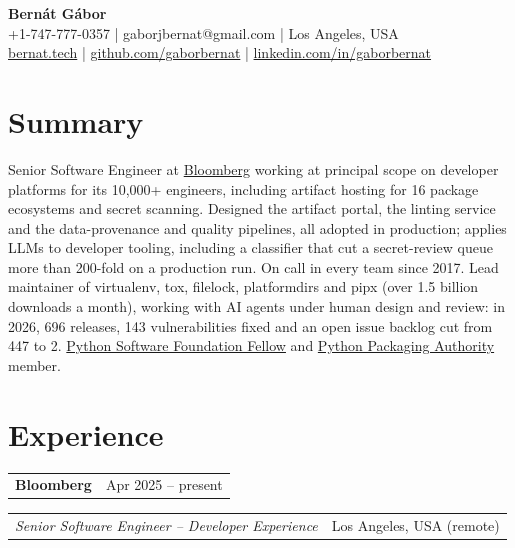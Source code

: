 \documentclass[10pt]{article}
\makeatletter
\newcommand{\entry}{\needspace{6\baselineskip}}
\newcommand{\twoColumns}[2]{%
  \noindent
  \begin{tabularx}{\textwidth}{@{}X r@{}}#2 & {\color{muted}#1}\\
  \end{tabularx}\par
}
\newcommand{\cvrule}{}
\makeatother
\begin{document}
\begin{center}
  {\Huge\bfseries\color{accent}Bernát Gábor}\\[6pt]
  +1-747-777-0357 \enspace|\enspace{} gaborjbernat@gmail.com \enspace|\enspace{} Los Angeles, USA\\ %
  \href{https://bernat.tech}{bernat.tech} \enspace|\enspace{}
  \href{https://github.com/gaborbernat}{github.com/gaborbernat} \enspace|\enspace{}
  \href{https://www.linkedin.com/in/gaborbernat}{linkedin.com/in/gaborbernat}
\end{center}

\section*{Summary}
\cvrule%
Senior Software Engineer at \href{https://www.bloomberg.com/company/}{Bloomberg} working at principal scope on
developer platforms for its 10{,}000+ engineers, including artifact hosting for 16 package ecosystems and secret
scanning. Designed the artifact portal, the linting service and the data-provenance and quality pipelines, all adopted
in production; applies LLMs to developer
tooling, including a classifier that cut a secret-review queue more than 200-fold on a production run. On call in every
team since 2017. Lead maintainer of virtualenv, tox, filelock, platformdirs and pipx (over 1.5 billion downloads a
month), working with AI agents under human design and review: in 2026, 696 releases, 143 vulnerabilities fixed and
an open issue backlog cut from 447 to 2.
\href{https://www.python.org/psf/fellows/}{Python Software Foundation Fellow} and
\href{https://www.pypa.io/}{Python Packaging Authority} member.

\section*{Experience}
\cvrule%
\entry%
\twoColumns{Apr 2025 -- present}{ \textbf{Bloomberg} }
\twoColumns{Los Angeles, USA (remote)}{ \emph{Senior Software Engineer -- Developer Experience} }
\end{document}
